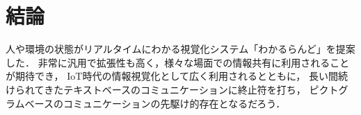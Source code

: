 \section{結論}
人や環境の状態がリアルタイムにわかる視覚化システム「わかるらんど」を提案した．
非常に汎用で拡張性も高く，様々な場面での情報共有に利用されることが期待でき，
IoT時代の情報視覚化として広く利用されるとともに，
長い間続けられてきたテキストベースのコミュニケーションに終止符を打ち，
ピクトグラムベースのコミュニケーションの先駆け的存在となるだろう．